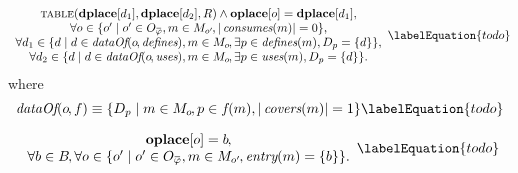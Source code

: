 \begin{equation}
  \begin{array}{c}
    \mTable(\mVar{dplace}[d_1], \mVar{dplace}[d_2], \mDomMatrix)
    \mAnd
    \mVar{oplace}[o] = \mVar{dplace}[d_1], \\
    \forall o \in
      \mSetBuilder{o'}%
                  {%
                    o' \in \mOpCompSet{\mPhi},
                    m \in \mMatchSet[o'] \hspace{-1pt},
                    \mCard{\mConsumes(m)} = 0
                  }, \\
    \forall d_1 \in
      \mSetBuilder{d}%
                  {%
                    d \in \mDataOf(o \hspace{-1pt}, \mDefines),
                    m \in \mMatchSet[o] \hspace{-1pt},
                    \exists p \in \mDefines(m),
                    \mDataSet[p] = \mSet{d}
                  }, \\
    \forall d_2 \in
      \mSetBuilder{d}%
                  {%
                    d \in \mDataOf(o \hspace{-1pt}, \mUses),
                    m \in \mMatchSet[o] \hspace{-1pt},
                    \exists p \in \mUses(m),
                    \mDataSet[p] = \mSet{d}
                  }.
  \end{array}
  \labelEquation{todo}
\end{equation}
%
where
%
\begin{equation}
  \mDataOf(o \hspace{-1pt}, f)
  \equiv
  \mSetBuilder{\mDataSet[p]}%
              {%
                m \in \mMatchSet[o] \hspace{-1pt},
                p \in f\hspace{-1pt}(m),
                \mCard{\mCovers(m)} = 1
              }
  \labelEquation{todo}
\end{equation}



\begin{equation}
  \begin{array}{c}
    \mVar{oplace}[o] = b \hspace{-.8pt}, \\
    \forall b \in \mBlockSet \hspace{-1pt},
    \forall o \in
      \mSetBuilder{o'}%
                  {%
                    o' \in \mOpCompSet{\mPhi},
                    m \in \mMatchSet[o'] \hspace{-1pt},
                    \mEntry(m) = \mSet{b}
                  }.
  \end{array}
  \labelEquation{todo}
\end{equation}

